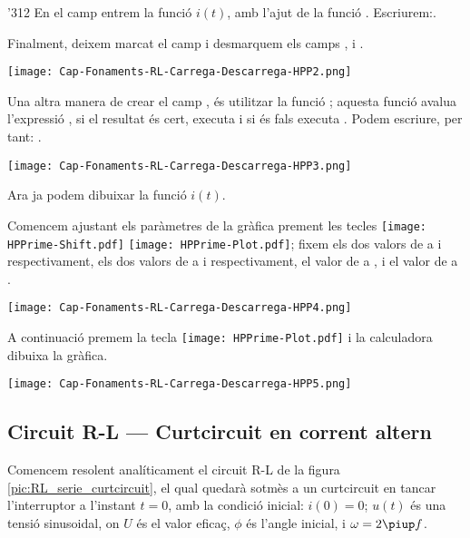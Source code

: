 \begin{exemple}
\begin{dingautolist}{'312}
            En el camp  entrem la funció $i(t)$, amb l'ajut de la funció  . Escriurem:\break {}.

            Finalment, deixem marcat el camp  i desmarquem els camps ,  i .

            \texttt{[image: Cap-Fonaments-RL-Carrega-Descarrega-HPP2.png]}

            Una altra manera de crear el camp , és utilitzar la funció ; aquesta funció avalua l'expressió , si el resultat   és cert, executa  i si és fals  executa . Podem escriure, per tant: .

            \texttt{[image: Cap-Fonaments-RL-Carrega-Descarrega-HPP3.png]}

        \item Ara ja podem dibuixar la funció $i(t)$.

            Comencem ajustant els paràmetres de la gràfica prement les tecles \texttt{[image: HPPrime-Shift.pdf]} \texttt{[image: HPPrime-Plot.pdf]}; fixem els dos valors de  a  i  respectivament, els dos valors de  a  i  respectivament, el valor de  a , i el valor de  a .

            \texttt{[image: Cap-Fonaments-RL-Carrega-Descarrega-HPP4.png]}

        \item A continuació premem la tecla \texttt{[image: HPPrime-Plot.pdf]} i la calculadora dibuixa la gràfica.

            \texttt{[image: Cap-Fonaments-RL-Carrega-Descarrega-HPP5.png]}
    \end{dingautolist}
\end{exemple}


\subsection {Circuit R-L --- Curtcircuit en corrent altern}\label{sec:ccRL}

Comencem resolent analíticament el circuit R-L de la figura \vref{pic:RL_serie_curtcircuit}, el qual quedarà sotmès a un curtcircuit en tancar l'interruptor a l'instant $t=0$, amb la condició inicial: $i(0) = 0$; $u(t)$ és una tensió sinusoidal, on $U$ és el valor eficaç, $\phi$ és l'angle inicial, i $\omega = 2 \piup f$.

